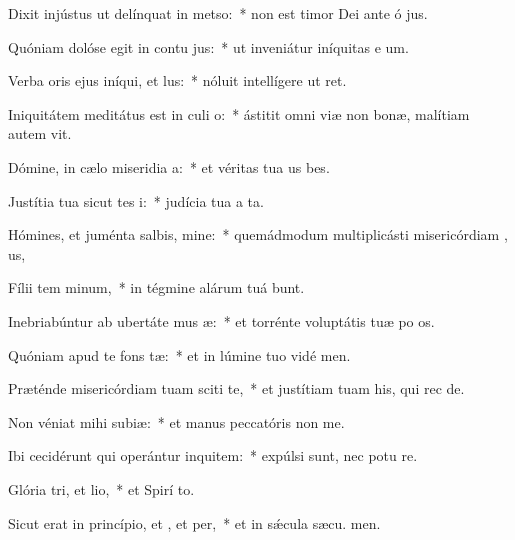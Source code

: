\item Dixit injústus ut delínquat in metso:~* non est timor Dei ante ó jus.
\item Quóniam dolóse egit in contu jus:~* ut inveniátur iníquitas e  um.
\item Verba oris ejus iníqui, et lus:~* nóluit intellígere ut  ret.
\item Iniquitátem meditátus est in culi o:~* ástitit omni viæ non bonæ, malítiam autem  vit.
\item Dómine, in cælo miseridia a:~* et véritas tua us  bes.
\item Justítia tua sicut tes i:~* judícia tua a ta.
\item Hómines, et juménta salbis, mine:~* quemádmodum multiplicásti misericórdiam , us,
\item Fílii tem minum,~* in tégmine alárum tuá bunt.
\item Inebriabúntur ab ubertáte mus æ:~* et torrénte voluptátis tuæ po os.
\item Quóniam apud te  fons tæ:~* et in lúmine tuo vidé men.
\item Præténde misericórdiam tuam sciti te,~* et justítiam tuam his, qui rec  de.
\item Non véniat mihi  subiæ:~* et manus peccatóris non  me.
\item Ibi cecidérunt qui operántur inquitem:~* expúlsi sunt, nec potu re.
\item Glória tri, et lio,~* et Spirí to.
\item Sicut erat in princípio, et , et per,~* et in sǽcula sæcu. men.
